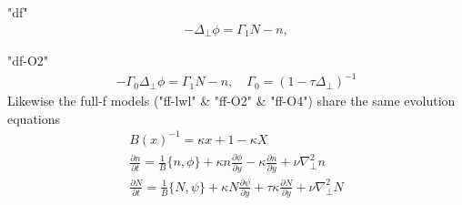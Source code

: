"df"
\begin{subequations}
\begin{align}
 -\Delta_{\perp} \phi =  \Gamma_1 N -n, 
\end{align}
\end{subequations}

"df-O2"
\begin{subequations}
\begin{align}
 -\Gamma_0\Delta_{\perp} \phi =  \Gamma_1 N -n, \quad \Gamma_0 = ( 1- \tau\Delta_{\perp})^{-1} 
\end{align}
\end{subequations}
Likewise the full-f models ("ff-lwl" \& "ff-O2" \& "ff-O4") share the same evolution equations
\begin{subequations}
\begin{align}
B(x)^{-1} = \kappa x +1-\kappa X \\ 
 \frac{\partial n}{\partial t}     = 
    \frac{1}{B}\{ n, \phi\} 
  + \kappa n\frac{\partial \phi}{\partial y} 
  -\kappa \frac{\partial n}{\partial y}
  + \nu \nabla_\perp^2 n  \\
  \frac{\partial N}{\partial t} =
  \frac{1}{B}\{ N, \psi\} 
  + \kappa N\frac{\partial \psi}{\partial y} 
  + \tau \kappa\frac{\partial N}{\partial y} +\nu\nabla_\perp^2N
\end{align}
\end{subequations}
